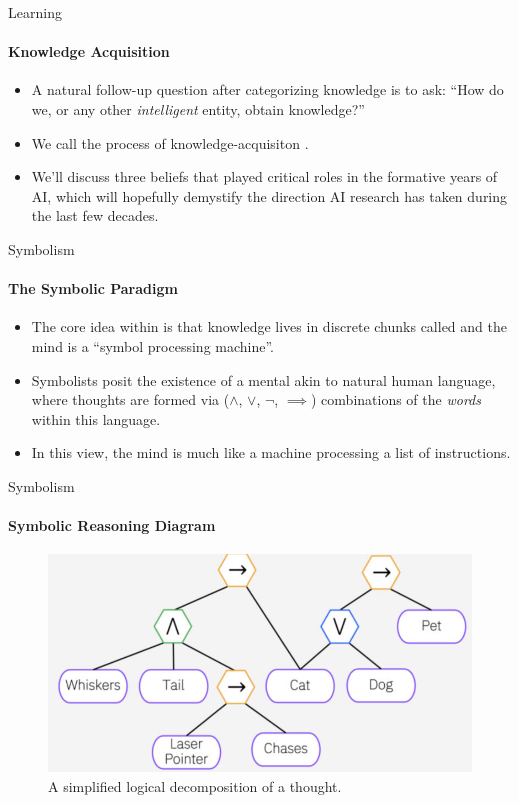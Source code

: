 \begin{frame}{Learning}
    \framesubtitle{Knowledge Acquisition}
    \begin{itemize}
        \item A natural follow-up question after categorizing knowledge is to ask: ``How do we, or any other \emph{intelligent} entity, obtain knowledge?''
        \item We call the process of knowledge-acquisiton .
        \item We'll discuss three beliefs that played critical roles in the formative years of AI, which will hopefully demystify the direction AI research has taken during the last few decades.
    \end{itemize}
\end{frame}

\begin{frame}{Symbolism}
    \framesubtitle{The Symbolic Paradigm}
    \begin{itemize}
        \item The core idea within  is that knowledge lives in discrete chunks called  and the mind is a ``symbol processing machine''. \\
        \item Symbolists posit the existence of a mental  akin to natural human language, where thoughts are formed via  ($\land$, $\lor$, $\neg$, $\implies$) combinations
              of the \emph{words} within this language.
        \item In this view, the mind is much like a machine processing a list of instructions.
    \end{itemize}
\end{frame}

\begin{frame}{Symbolism}
    \framesubtitle{Symbolic Reasoning Diagram}
    \begin{figure}
        \centering
        \includegraphics[width=0.8\linewidth]{images/symbolic-ai.jpg}
        \caption{A simplified logical decomposition of a thought. }
    \end{figure}
\end{frame}

